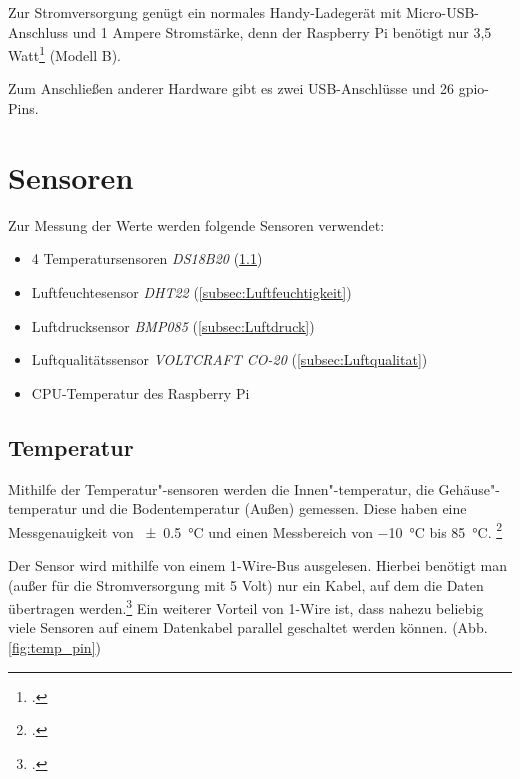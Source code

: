 Zur Stromversorgung genügt ein normales Handy-Ladegerät mit Micro-USB-Anschluss und 1 \gls{Ampere} Stromstärke, denn der Raspberry Pi benötigt nur 3,5 Watt\footcite{strom} (Modell B).

Zum Anschließen anderer Hardware gibt es zwei USB-Anschlüsse und 26 \gls{gpio}-Pins.

\section{Sensoren}
\label{sec:Sensoren}

Zur Messung der Werte werden folgende Sensoren verwendet:
\begin{itemize}
\item 4 Temperatursensoren \textit{DS18B20} (\ref{subsec:Temperatur})
\item Luftfeuchtesensor \textit{DHT22} (\ref{subsec:Luftfeuchtigkeit})
\item Luftdrucksensor \textit{BMP085} (\ref{subsec:Luftdruck})
\item Luftqualitätssensor \textit{VOLTCRAFT CO-20} (\ref{subsec:Luftqualitat})
\item CPU-Temperatur des Raspberry Pi
\end{itemize}
\subsection{Temperatur}
\label{subsec:Temperatur}



Mithilfe der Temperatur"-sensoren werden die Innen"-temperatur, die Gehäuse"-temperatur und die Bodentemperatur (Außen) gemessen. Diese haben eine Messgenauigkeit von \SI{\pm 0.5}{\degreeCelsius}  und einen Messbereich von \SI{-10}{\degreeCelsius}  bis \SI{+85}{\degreeCelsius}. \footcite[20]{temp}

Der Sensor wird mithilfe von einem 1-Wire-Bus ausgelesen. Hierbei benötigt man (außer für die Stromversorgung mit 5 \gls{Volt}) nur ein Kabel, auf dem die Daten übertragen werden.\footcite{1-wire}
Ein weiterer Vorteil von 1-Wire ist, dass nahezu beliebig viele Sensoren auf einem Datenkabel parallel geschaltet werden können. (Abb. \ref{fig:temp_pin})


